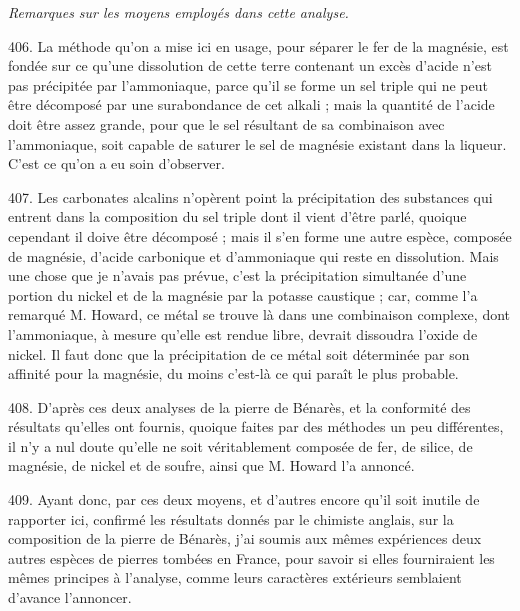 \documentclass[a4paper, 11pt, oneside, polutonikogreek, french]{article}
\begin{document}
\begin{center}
\emph{Remarques sur les moyens employés dans cette analyse.}
\end{center}

406. La méthode qu'on a mise ici en usage, pour séparer le fer de la magnésie, est fondée sur ce qu'une dissolution de cette terre contenant un excès d'acide n'est pas précipitée par l'ammoniaque, parce qu'il se forme un sel triple qui ne peut être décomposé par une surabondance de cet alkali ; mais la quantité de l'acide doit être assez grande, pour que le sel résultant de sa combinaison avec l'ammoniaque, soit capable de saturer le sel de magnésie existant dans la liqueur. C'est ce qu'on a eu soin d'observer.

407. Les carbonates alcalins n'opèrent point la précipitation des substances qui entrent dans la composition du sel triple dont il vient d'être parlé, quoique cependant il doive être décomposé ; mais il s'en forme une autre espèce, composée de magnésie, d'acide carbonique et d'ammoniaque qui reste en dissolution. Mais une chose que je n'avais pas prévue, c'est la précipitation simultanée d'une portion du nickel et de la magnésie par la potasse caustique ; car, comme l'a remarqué M. Howard, ce métal se trouve là dans une combinaison complexe, dont l'ammoniaque, à mesure qu'elle est rendue libre, devrait dissoudra l'oxide de nickel. Il faut donc que la précipitation de ce métal soit déterminée par son affinité pour la magnésie, du moins c'est-là ce qui paraît le plus probable.

408. D'après ces deux analyses de la pierre de Bénarès, et la conformité des résultats qu'elles ont fournis, quoique faites par des méthodes un peu différentes, il n'y a nul doute qu'elle ne soit véritablement composée de fer, de silice, de magnésie, de nickel et de soufre, ainsi que M. Howard l'a annoncé.

409. Ayant donc, par ces deux moyens, et d'autres encore qu'il soit inutile de rapporter ici, confirmé les résultats donnés par le chimiste anglais, sur la composition de la pierre de Bénarès, j'ai soumis aux mêmes expériences deux autres espèces de pierres tombées en France, pour savoir si elles fourniraient les mêmes principes à l'analyse, comme leurs caractères extérieurs semblaient d'avance l'annoncer.
\end{document}
